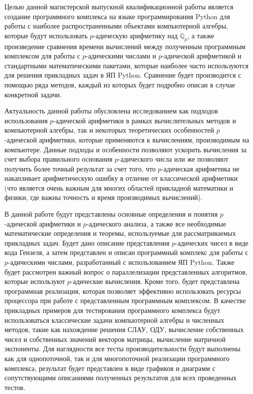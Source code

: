 \documentclass[master, och, diploma, times]{sty/SCWorks}
\theoremstyle{plain}
\theoremstyle{definition}
\numberwithin{equation}{section}
\begin{document}
Целью данной магистерской выпускной квалификационной работы является создание программного комплекса на языке программирования Python для работы с наиболее распространенными объектами компьютерной алгебры, которые будут использовать $p$-адическую арифметику над $\mathbb{Q}_p$, а также произведение сравнения времени вычислений между полученным программным комплексом для работы с $p$-адическими числами и $p$-адической арифметикой и стандартными математическими пакетами, которые наиболее часто используются для решения прикладных задач в ЯП Python. Сравнение будет производится с помощью ряда методов, каждый из которых будет подробно описан в случае конкретной задачи.

Актуальность данной работы обусловлена исследованием как подходов использования $p$-адической арифметики в рамках вычислительных методов и компьютерной алгебры, так и некоторых теоретических особенностей $p$-адической арифметики, которые применяются к вычислениям, производимым на компьютере. Данные подходы и особенности позволяют ускорить вычисления за счет выбора правильного основания $p$-адического числа или же  позволяют получить более точный результат за счет того, что $p$-адическая арифметика не накапливает арифметическую ошибку в отличие от классической арифметики (что является очень важным для многих областей прикладной математики и физики, где важны точность и время производимых вычислений).

В данной работе будут представлены основные определения и понятия $p$-адической арифметики и $p$-адического анализа, а также все необходимые математические определения и теоремы, используемые для рассматриваемых прикладных задач. Будет дано описание представления $p$-адических чисел в виде кода Гензеля, а затем представлен и описан программный комплекс для работы с $p$-адическими числами, разработанный с использованием  ЯП Python. Также будет рассмотрен важный вопрос о параллелизации представленных алгоритмов, которые используют $p$-адические вычисления. Кроме того, будет представлена программная реализация, которая позволяет эффективно использовать ресурсы процессора при работе с представленным программным комплексом. В качестве прикладных примеров для тестирования программного комплекса будут использоваться классические задачи компьютерной алгебры и численных методов, такие как нахождение решения СЛАУ, ОДУ, вычисление собственных чисел и собственных значений векторов матрицы, вычисление матричной экспоненты. Для наглядности все тесты производительности будут выполнены как для однопоточной, так и для многопоточной реализации программного комплекса, результат будет представлен в виде графиков и диаграмм с сопутствующими описаниями полученных результатов для всех проведенных тестов.
\end{document}
